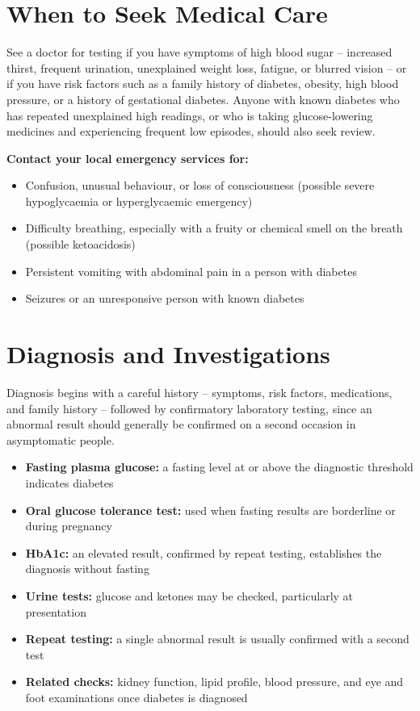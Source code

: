 \section*{When to Seek Medical Care}
See a doctor for testing if you have symptoms of high blood sugar -- increased thirst, frequent urination, unexplained weight loss, fatigue, or blurred vision -- or if you have risk factors such as a family history of diabetes, obesity, high blood pressure, or a history of gestational diabetes. Anyone with known diabetes who has repeated unexplained high readings, or who is taking glucose-lowering medicines and experiencing frequent low episodes, should also seek review.

\textbf{Contact your local emergency services for:}
\begin{itemize}
    \item Confusion, unusual behaviour, or loss of consciousness (possible severe hypoglycaemia or hyperglycaemic emergency)
    \item Difficulty breathing, especially with a fruity or chemical smell on the breath (possible ketoacidosis)
    \item Persistent vomiting with abdominal pain in a person with diabetes
    \item Seizures or an unresponsive person with known diabetes
\end{itemize}

\section*{Diagnosis and Investigations}
Diagnosis begins with a careful history -- symptoms, risk factors, medications, and family history -- followed by confirmatory laboratory testing, since an abnormal result should generally be confirmed on a second occasion in asymptomatic people.

\begin{itemize}
    \item \textbf{Fasting plasma glucose:} a fasting level at or above the diagnostic threshold indicates diabetes
    \item \textbf{Oral glucose tolerance test:} used when fasting results are borderline or during pregnancy
    \item \textbf{HbA1c:} an elevated result, confirmed by repeat testing, establishes the diagnosis without fasting
    \item \textbf{Urine tests:} glucose and ketones may be checked, particularly at presentation
    \item \textbf{Repeat testing:} a single abnormal result is usually confirmed with a second test
    \item \textbf{Related checks:} kidney function, lipid profile, blood pressure, and eye and foot examinations once diabetes is diagnosed
\end{itemize}

